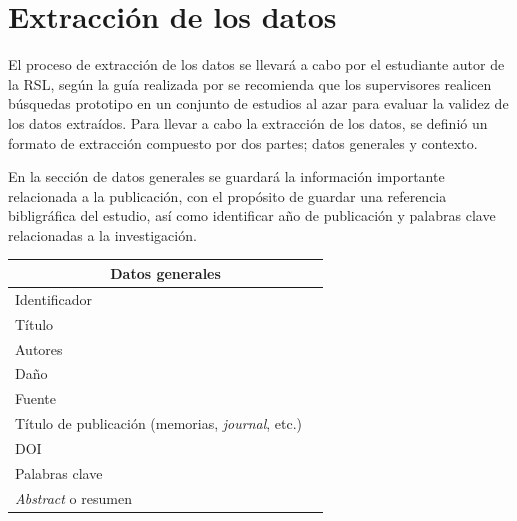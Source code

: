 \documentclass{article}
\begin{document}
\begin{center}
\begin{table}[ht]
        \caption{Calidad} 
        \centering 
        \label{table:tablacalidad}
\end{table}
\end{center}

\newpage

\section{Extracción de los datos}
El proceso de extracción de los datos se llevará a cabo por el estudiante autor de la RSL, según la guía realizada por
\cite{kitchenham2007guidelines} se recomienda que los supervisores realicen búsquedas prototipo en un conjunto de estudios al azar para evaluar la validez 
de los datos extraídos.
Para llevar a cabo la extracción de los datos, se definió un formato de extracción compuesto por dos partes; datos generales y contexto.

En la sección de datos generales se guardará la información importante relacionada a la publicación, con el propósito de guardar 
una referencia bibligráfica del estudio, así como identificar año de publicación y palabras clave relacionadas a la investigación. 
\begin{center}
\begin{tabular}{ |l|l| }
\hline
\multicolumn{2}{|c|}{Datos generales} \\
  \hline
    Identificador &       \\
    \hline
    Título & \\
    \hline
    Autores &\\
    \hline
    Daño & \\
    \hline
    Fuente & \\
    \hline
    Título de publicación (memorias, \emph{journal}, etc.) & \\
    \hline
    DOI & \\
    \hline
    Palabras clave & \\
    \hline
    \emph{Abstract} o resumen & \\
 \hline
\end{tabular}
\end{center}
\end{document}
